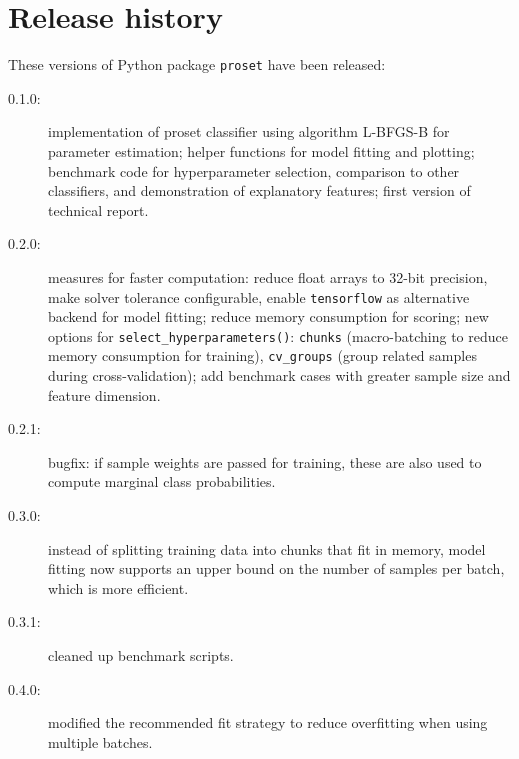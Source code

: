 \section{Release history}
\label{sec_release_history}
%
These versions of Python package \texttt{proset} have been released:
%
\begin{description}
\item[0.1.0:] implementation of proset classifier using algorithm L-BFGS-B \cite{Byrd_95} for parameter estimation;
helper functions for model fitting and plotting;
benchmark code for hyperparameter selection, comparison to other classifiers, and demonstration of explanatory features;
first version of technical report.
%
\item[0.2.0:] measures for faster computation: reduce float arrays to 32-bit precision, make solver tolerance configurable,
enable \texttt{tensorflow} \cite{Abadi_15} as alternative backend for model fitting;
reduce memory consumption for scoring;
new options for \texttt{select\_hyperparameters()}: \texttt{chunks} (macro-batching to reduce memory consumption for training), \texttt{cv\_groups} (group related samples during cross-validation);
add benchmark cases with greater sample size and feature dimension.
%
\item[0.2.1:] bugfix: if sample weights are passed for training, these are also used to compute marginal class probabilities.
%
\item[0.3.0:] instead of splitting training data into chunks that fit in memory, model fitting now supports an upper bound
on the number of samples per batch, which is more efficient.
%
\item[0.3.1:] cleaned up benchmark scripts.
%
\item[0.4.0:] modified the recommended fit strategy to reduce overfitting when using multiple batches.
\end{description}
%
\endinput
